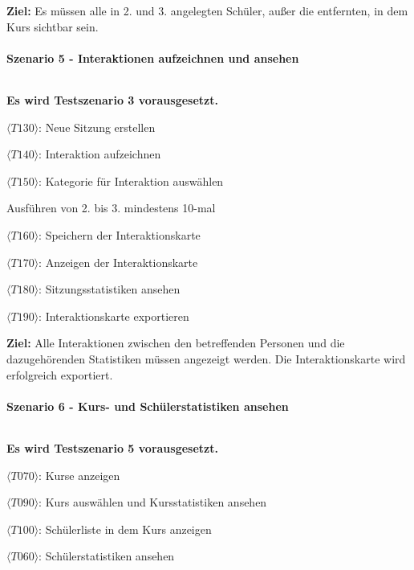         \textbf{\sffamily Ziel:} Es müssen alle in 2. und 3. angelegten Schüler, außer die entfernten, in dem Kurs sichtbar sein.
    
    \paragraph{Szenario 5 - Interaktionen aufzeichnen und ansehen} $~$ 
    
        \textbf{Es wird Testszenario 3 vorausgesetzt.}
        
        
        \begin{test5}
            \item $\langle T130 \rangle$: Neue Sitzung erstellen
            \item $\langle T140 \rangle$: Interaktion aufzeichnen
            \item $\langle T150 \rangle$: Kategorie für Interaktion auswählen
            \item Ausführen von 2. bis 3. mindestens 10-mal
            \item $\langle T160 \rangle$: Speichern der Interaktionskarte
            \item $\langle T170 \rangle$: Anzeigen der Interaktionskarte
            \item $\langle T180 \rangle$: Sitzungsstatistiken ansehen
            \item $\langle T190 \rangle$: Interaktionskarte exportieren
        \end{test5}
        
        \textbf{\sffamily Ziel:} Alle Interaktionen zwischen den betreffenden Personen und die dazugehörenden Statistiken müssen angezeigt werden. Die Interaktionskarte wird erfolgreich exportiert.

    \paragraph{Szenario 6 - Kurs- und Schülerstatistiken ansehen} $~$ 
    
        \textbf{Es wird Testszenario 5 vorausgesetzt.}
        
        
        \begin{test6}
            \item $\langle T070 \rangle$: Kurse anzeigen
            \item $\langle T090 \rangle$: Kurs auswählen und Kursstatistiken ansehen
            \item $\langle T100 \rangle$: Schülerliste in dem Kurs anzeigen
            \item $\langle T060 \rangle$: Schülerstatistiken ansehen
        \end{test6}
        
